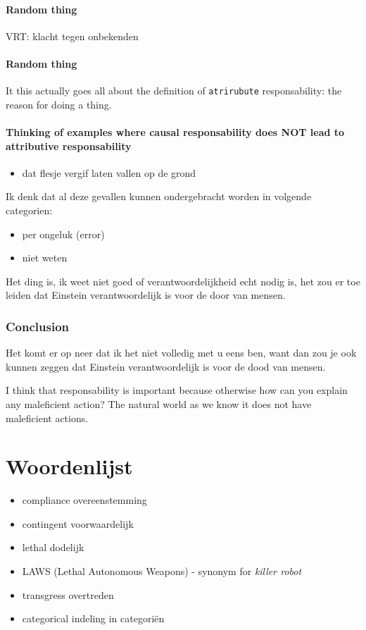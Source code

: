 \documentclass[../main/main.tex]{subfiles}
\begin{document}
\paragraph{Random thing}
VRT: klacht tegen onbekenden


\paragraph{Random thing}
It this actually goes all about the definition of \texttt{atrirubute} responsability: the reason for doing a thing.

\paragraph{Thinking of examples where causal responsability does NOT lead to attributive responsability}
\begin{itemize}
\item dat flesje vergif laten vallen op de grond
\end{itemize}
Ik denk dat al deze gevallen kunnen ondergebracht worden in volgende categorien:
\begin{itemize}
\item per ongeluk (error)
\item niet weten
\end{itemize}

Het ding is, ik weet niet goed of verantwoordelijkheid echt nodig is, het zou er toe leiden dat Einstein verantwoordelijk is voor de door van mensen.

\subsubsection{Conclusion}
Het komt er op neer dat ik het niet volledig met u eens ben, want dan zou je ook kunnen zeggen dat Einstein verantwoordelijk is voor de dood van mensen.

I think that responsability is important because otherwise how can you explain any maleficient action? The natural world as we know it does not have maleficient actions.


\newpage
\section{Woordenlijst}
\begin{itemize}
\item compliance \hfill overeenstemming
\item contingent \hfill voorwaardelijk
\item lethal	\hfill dodelijk
\item LAWS	\hfill (Lethal Autonomous Weapons) - synonym for \textit{killer robot}

\item transgress \hfill overtreden
\item categorical \hfill indeling in categoriën

\end{itemize}
\end{document}
